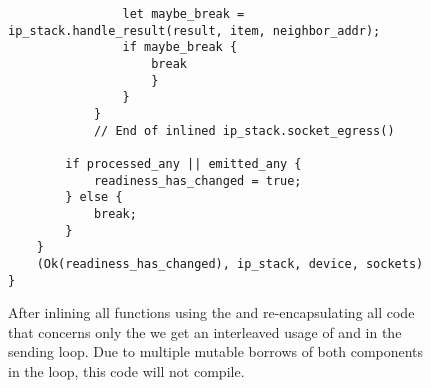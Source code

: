 \begin{figure}[H]
\begin{verbatim}
                let maybe_break = ip_stack.handle_result(result, item, neighbor_addr);
                if maybe_break {
                    break
                    }
                }
            }
            // End of inlined ip_stack.socket_egress()

        if processed_any || emitted_any {
            readiness_has_changed = true;
        } else {
            break;
        }
    }
    (Ok(readiness_has_changed), ip_stack, device, sockets)
}
\end{verbatim}
\caption{After inlining all functions using the \dev{} and re-encapsulating all code that concerns only the \stack{} we get an interleaved usage of \stack{} and \dev{} in the sending loop. Due to multiple mutable borrows of both components in the loop, this code will not compile.}
\label{appFig:egressInlinedOriginal}
\end{figure}